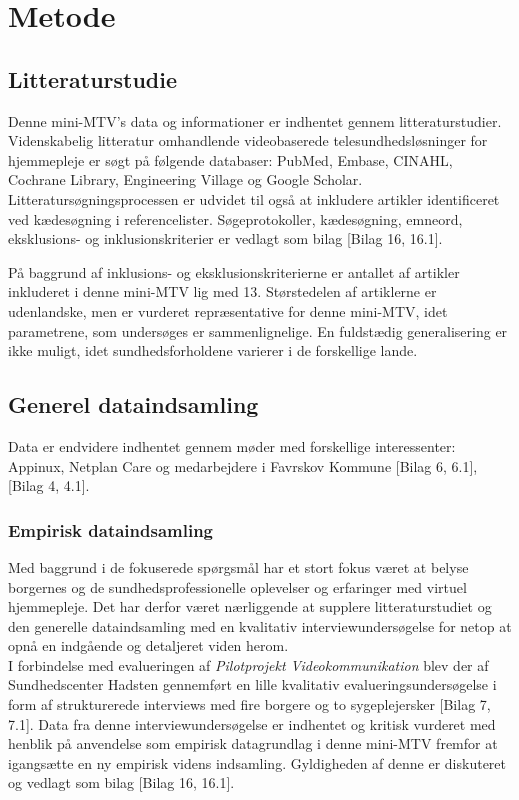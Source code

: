 \chapter{Metode}\label{chap:metode}

\section{Litteraturstudie}
Denne mini-MTV's data og informationer er indhentet gennem litteraturstudier. Videnskabelig litteratur omhandlende videobaserede telesundhedsløsninger for hjemmepleje er søgt på følgende databaser: PubMed, Embase, CINAHL, Cochrane Library, Engineering Village og Google Scholar. Litteratursøgningsprocessen er udvidet til også at inkludere artikler identificeret ved kædesøgning i referencelister. Søgeprotokoller, kædesøgning, emneord, eksklusions- og inklusionskriterier er vedlagt som bilag [Bilag 16, 16.1]. 

På baggrund af inklusions- og eksklusionskriterierne er antallet af artikler inkluderet i denne mini-MTV lig med 13. Størstedelen af artiklerne er udenlandske, men er vurderet repræsentative for denne mini-MTV, idet parametrene, som undersøges er sammenlignelige. En fuldstædig generalisering er ikke muligt, idet sundhedsforholdene varierer i de forskellige lande.   

\section{Generel dataindsamling}
Data er endvidere indhentet gennem møder med forskellige interessenter: Appinux, Netplan Care og medarbejdere i Favrskov Kommune [Bilag 6, 6.1], [Bilag 4, 4.1]. 

\subsection{Empirisk dataindsamling}
Med baggrund i de fokuserede spørgsmål har et stort fokus været at belyse borgernes og de sundhedsprofessionelle oplevelser og erfaringer med virtuel hjemmepleje. Det har derfor været nærliggende at supplere litteraturstudiet og den generelle dataindsamling med en kvalitativ interviewundersøgelse for netop at opnå en indgående og detaljeret viden herom.\\
I forbindelse med evalueringen af \textit{Pilotprojekt Videokommunikation} blev der af Sundhedscenter Hadsten gennemført en lille kvalitativ evalueringsundersøgelse i form af strukturerede interviews med fire borgere og to sygeplejersker [Bilag 7, 7.1]. Data fra denne interviewundersøgelse er indhentet og kritisk vurderet med henblik på anvendelse som empirisk datagrundlag i denne mini-MTV fremfor at igangsætte en ny empirisk videns indsamling. Gyldigheden af denne er diskuteret og vedlagt som bilag [Bilag 16, 16.1].


  
	 

